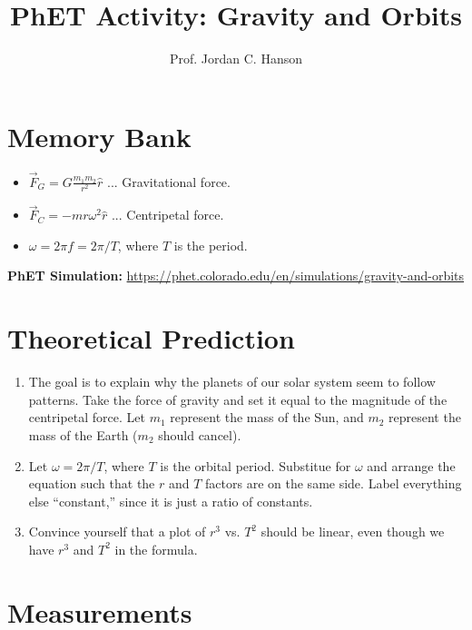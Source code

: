 \documentclass{article}
\begin{document}
\title{PhET Activity: Gravity and Orbits}
\author{Prof. Jordan C. Hanson}

\maketitle

\section{Memory Bank}

\begin{itemize}
\item $\vec{F}_G = G \frac{m_1 m_2}{r^2}\hat{r}$ ... Gravitational force.
\item $\vec{F}_{C} = -m r \omega^2 \hat{r}$ ... Centripetal force.
\item $\omega = 2\pi f = 2\pi/T$, where $T$ is the period.
\end{itemize}

\textbf{PhET Simulation:} \url{https://phet.colorado.edu/en/simulations/gravity-and-orbits}

\section{Theoretical Prediction}

\begin{enumerate}
\item The goal is to explain why the planets of our solar system seem to follow patterns.  Take the force of gravity and set it equal to the magnitude of the centripetal force.  Let $m_1$ represent the mass of the Sun, and $m_2$ represent the mass of the Earth ($m_2$ should cancel).
\item Let $\omega = 2\pi/T$, where $T$ is the orbital period.  Substitue for $\omega$ and arrange the equation such that the $r$ and $T$ factors are on the same side.  Label everything else ``constant,'' since it is just a ratio of constants.
\item Convince yourself that a plot of $r^3$ vs. $T^2$ should be linear, even though we have $r^3$ and $T^2$ in the formula.
\end{enumerate}

\section{Measurements}
\end{document}
